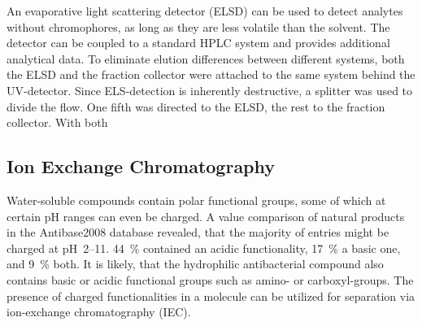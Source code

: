 		An evaporative light scattering detector (ELSD) can be used to detect analytes without chromophores, as long as they are less volatile than the solvent.\autocite{Mathews2004,Righezza1988,Mourey1984,Charlesworth1978}
		The detector can be coupled to a standard HPLC system and provides additional analytical data.
		To eliminate elution differences between different systems, both the ELSD and the fraction collector were attached to the same system behind the UV-detector.
		Since ELS-detection is inherently destructive, a splitter was used to divide the flow. One fifth was directed to the ELSD, the rest to the fraction collector.
		With both 
	    
	    

    \subsection{Ion Exchange Chromatography} %
    \label{sub:results_ion_exchange_chromatography}

	Water-soluble compounds contain polar functional groups, some of which at certain pH ranges can even be charged.
	A \pka value comparison of natural products in the Antibase2008 database revealed, that the majority of entries might be charged at pH~2--11.\autocite{Mansson2010}
	44~\% contained an acidic functionality, 17~\% a basic one, and 9~\% both.
	It is likely, that the hydrophilic antibacterial compound also contains basic or acidic functional groups such as amino- or carboxyl-groups.
	The presence of charged functionalities in a molecule can be utilized for separation via ion-exchange chromatography (IEC).
	

